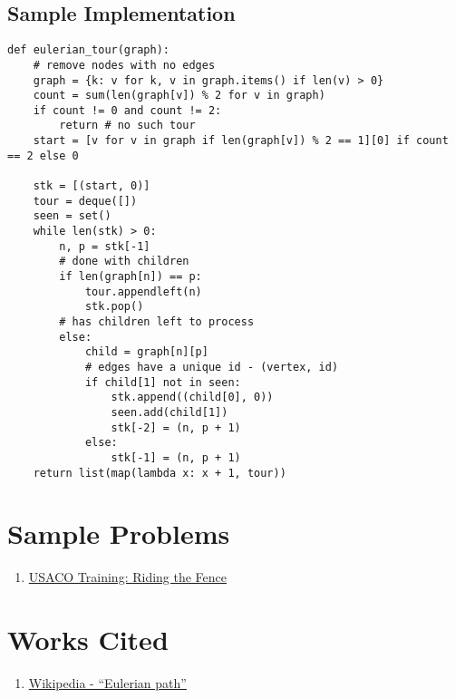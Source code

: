 \documentclass[11pt, oneside]{article}
\begin{document}
\subsection{Sample Implementation}

\begin{verbatim}
def eulerian_tour(graph):
    # remove nodes with no edges
    graph = {k: v for k, v in graph.items() if len(v) > 0}
    count = sum(len(graph[v]) % 2 for v in graph)
    if count != 0 and count != 2:
        return # no such tour
    start = [v for v in graph if len(graph[v]) % 2 == 1][0] if count == 2 else 0

    stk = [(start, 0)]
    tour = deque([])
    seen = set()
    while len(stk) > 0:
        n, p = stk[-1]
        # done with children
        if len(graph[n]) == p:
            tour.appendleft(n)
            stk.pop()
        # has children left to process
        else:
            child = graph[n][p]
            # edges have a unique id - (vertex, id)
            if child[1] not in seen:
                stk.append((child[0], 0))
                seen.add(child[1])
                stk[-2] = (n, p + 1)
            else:
                stk[-1] = (n, p + 1)
    return list(map(lambda x: x + 1, tour))
\end{verbatim}

\section{Sample Problems}

\begin{enumerate}
  \item \href{https://train.usaco.org/usacoprob2?a=TpH8RHs6Taa&S=fence}{USACO Training: Riding the Fence}
\end{enumerate}

\section{Works Cited}

\begin{enumerate}
  \item \href{https://en.wikipedia.org/wiki/Eulerian_path}{Wikipedia - ``Eulerian path''}
\end{enumerate}
\end{document}
